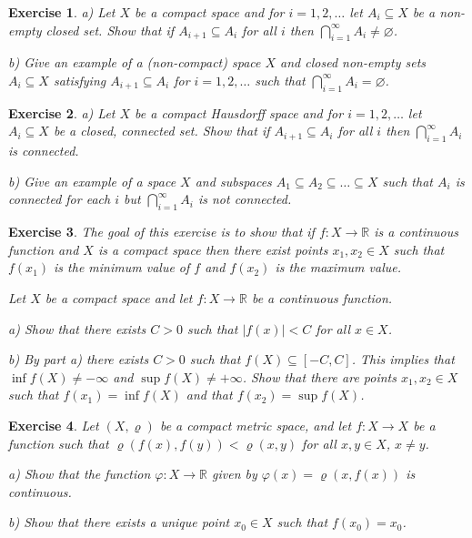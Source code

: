 \documentclass[11pt, letterpaper, oneside]{report}
\theoremstyle{pplain}
\newtheorem{ITERMVALUE THM}[theorem]{Intermediate Value Theorem}
\newtheorem{HEINEBOREL THM}[theorem]{Heine-Borel Theorem}
\newtheorem{UMETR THM}[theorem]{Urysohn Metrization Theorem}
\newtheorem{UMETR2 THM}[theorem]{Urysohn Metrization Theorem (v.2)}
\theoremstyle{ddefinition}
\theoremstyle{nnn}
\newtheorem{TDA NN}[theorem]{Topological Data Analysis. }
\theoremstyle{eexercise}
\newtheorem{exercise}{Exercise}[chapter]
\newcommand{\R}{{\mathbb R}}
\begin{document}
\begin{exercise}
a) Let $X$ be a compact  space and for $i=1, 2, \dots$ let $A_{i} \subseteq X$ be a 
non-empty closed set. Show that if $A_{i+1} \subseteq A_{i}$ for all $i$
then $\bigcap_{i=1}^{\infty}A_{i} \neq \varnothing$. 

b) Give an example of a (non-compact) space $X$ and  closed non-empty sets 
$A_{i}\subseteq X$ satisfying $A_{i+1}\subseteq A_{i}$ for $i=1, 2, \dots$ such that 
$\bigcap_{i=1}^{\infty} A_{i} = \varnothing$. 
\end{exercise}




\begin{exercise} a) Let $X$ be a compact  Hausdorff space and for $i=1, 2, \dots$ let $A_{i} \subseteq X$ be a 
closed, connected set. Show that if $A_{i+1} \subseteq A_{i}$ for all $i$
then $\bigcap_{i=1}^{\infty}A_{i}$ is connected. 

b) Give an example of a space $X$ and subspaces $A_{1}\subseteq A_{2}\subseteq {\dots} \subseteq X$
such that $A_{i}$ is connected for each $i$ but $\bigcap_{i=1}^{\infty}A_{i}$ is not connected.
\end{exercise}






\begin{exercise}
\label{COMP MINMAX EXE}
The goal of this exercise is to show that if $f\colon X\to \R$ is a continuous function 
and $X$ is a compact space then there exist points $x_{1}, x_{2}\in X$ such that 
$f(x_{1})$ is the minimum value of $f$ and $f(x_{2})$ is the maximum value. 

Let $X$ be a compact space and let $f\colon X\to \R$ be a continuous function. 

a) Show that there exists $C > 0 $  such that $|f(x)| < C$ for all 
$x\in X$. 

b) By part a)  there exists $C> 0$ such that $f(X)\subseteq [-C, C]$. This implies  that $\inf f(X)\neq -\infty$
and $\sup f(X)\neq +\infty$. Show that there are points $x_{1}, x_{2}\in X$ such that 
$f(x_{1}) = \inf f(X)$ and  that $f(x_{2}) = \sup f(X)$. 
\end{exercise}




\begin{exercise}
\label{COMPACT METRIC FIXED POINT EXERCISE}
Let $(X, \varrho)$ be a compact metric space, and let $f\colon X\to X$ be a function 
such that $\varrho(f(x), f(y)) < \varrho(x, y)$ for all $x, y\in X$, $x\neq y$. 

a) Show that the function $\varphi\colon X \to \R$ given by $\varphi(x) = \varrho(x, f(x))$
is continuous. 

b) Show that there exists a unique point $x_{0}\in X$ such that $f(x_{0}) = x_{0}$. 
\end{exercise}
\end{document}
